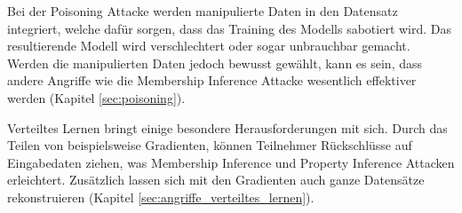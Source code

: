 Bei der Poisoning Attacke werden manipulierte Daten in den Datensatz integriert, welche dafür sorgen, dass das Training des Modells sabotiert wird.
Das resultierende Modell wird verschlechtert oder sogar unbrauchbar gemacht.
Werden die manipulierten Daten jedoch bewusst gewählt, kann es sein, dass andere Angriffe wie die Membership Inference Attacke wesentlich effektiver werden (Kapitel \ref{sec:poisoning}).

Verteiltes Lernen bringt einige besondere Herausforderungen mit sich.
Durch das Teilen von beispielsweise Gradienten, können Teilnehmer Rückschlüsse auf Eingabedaten ziehen, was Membership Inference und Property Inference Attacken erleichtert.
Zusätzlich lassen sich mit den Gradienten auch ganze Datensätze rekonstruieren (Kapitel \ref{sec:angriffe_verteiltes_lernen}).